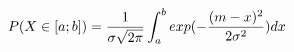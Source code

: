 \documentclass[preview]{standalone}
\begin{document}
\begin{align*}
P( X \in [a;b] ) = { \frac{1}{\sigma \sqrt{2\pi}} } \int_a^b { exp(-{  {(m - x)^2} \over {2 \sigma^2} }) } \space dx
\end{align*}
\end{document}
